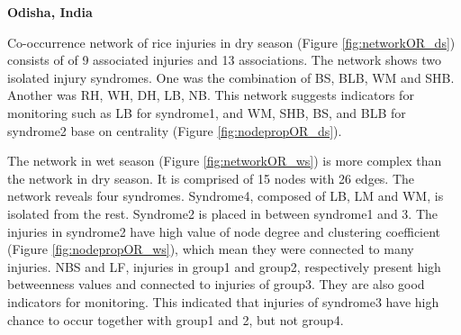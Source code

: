 \textbf{Odisha, India}

Co-occurrence network of rice injuries in dry season (Figure \ref{fig:networkOR_ds}) consists of of 9 associated injuries and 13 associations. The network shows two isolated injury syndromes. One was the combination of BS, BLB, WM and SHB. Another was RH, WH, DH, LB, NB. This network suggests indicators for monitoring such as LB for syndrome1, and WM, SHB, BS, and BLB for syndrome2 base on centrality (Figure \ref{fig:nodepropOR_ds}).  

The network in wet season (Figure \ref{fig:networkOR_ws}) is more complex than the network in dry season. It is comprised of 15 nodes with 26 edges. The network reveals four syndromes. Syndrome4, composed of LB, LM and WM, is isolated from the rest. Syndrome2 is placed in between syndrome1 and 3. The injuries in syndrome2 have high value of node degree and clustering coefficient (Figure \ref{fig:nodepropOR_ws}), which mean they were connected to many injuries. NBS and LF, injuries in group1 and group2, respectively present high betweenness values and connected to injuries of group3. They are also good indicators for monitoring. This indicated that injuries of syndrome3 have high chance to occur together with group1 and 2, but not group4. 

